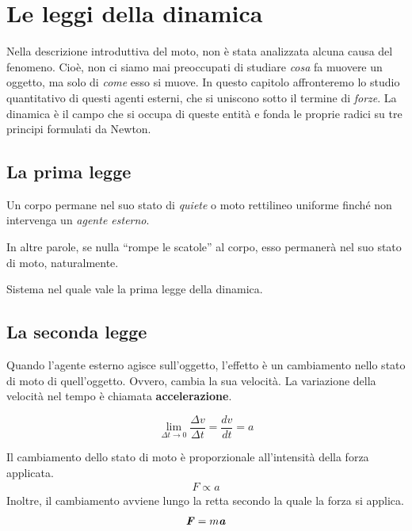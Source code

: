 \marginpar{\minitoc}

\section{Le leggi della dinamica}

Nella descrizione introduttiva del moto, non è stata analizzata alcuna causa del
fenomeno. Cioè, non ci siamo mai preoccupati di studiare \textit{cosa}
fa muovere un oggetto, ma solo di \textit{come} esso si muove. In
questo capitolo affronteremo lo studio quantitativo di questi agenti
esterni, che si uniscono sotto il termine di \textit{forze}. La dinamica
è il campo che si occupa di queste entità e fonda le proprie radici su
tre principi formulati da Newton.

\subsection{La prima legge}

\begin{tcolorbox}[colback = red!30, colframe = red!30!black, title = {Prima legge della dinamica (legge di inerzia)}]
    Un corpo permane nel suo stato di \textit{quiete} o moto rettilineo uniforme
    finché non intervenga un \textit{agente esterno}.
\end{tcolorbox}

\noindent In altre parole, se nulla ``rompe le scatole'' al corpo, esso permanerà nel suo
stato di moto, naturalmente.

\begin{tcolorbox}[colback = yellow!30, colframe = yellow!30!black, title = {Sistema inerziale}]
    Sistema nel quale vale la prima legge della dinamica.
\end{tcolorbox}

\subsection{La seconda legge}
Quando l'agente esterno agisce sull'oggetto, l'effetto è un cambiamento nello
stato di moto di quell'oggetto. Ovvero, cambia la sua velocità. La variazione
della velocità nel tempo è chiamata \textbf{accelerazione}.

\[ \lim_{\Delta t \to 0} \frac{\Delta v}{\Delta t} = \frac{dv}{dt} = a \]


\begin{tcolorbox}[colback = red!30, colframe = red!30!black, title = {Seconda legge della dinamica}]
Il cambiamento dello stato di moto è proporzionale all'intensità della forza applicata.
    \begin{align}
        F \propto a
    \end{align}
Inoltre, il cambiamento avviene lungo la retta secondo la quale la forza
si applica.
    \begin{align}
        \textbf{\textit{F}} = m \textbf{\textit{a}}
    \end{align}
\end{tcolorbox}

